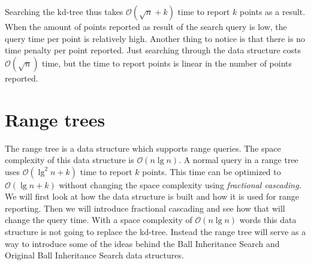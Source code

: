 
Searching the kd-tree thus takes $\mathcal{O}(\sqrt{n} + k)$ time to report $k$ points as a result. When the amount of points reported as result of the search query is low, the query time per point is relatively high. Another thing to notice is that there is no time penalty per point reported. Just searching through the data structure costs $\mathcal{O}(\sqrt{n})$ time, but the time to report points is linear in the number of points reported.



\section{Range trees}
\label{sect:rangetrees}

The range tree is a data structure which supports range queries. The space complexity of this data structure is $\mathcal{O}(n\lg n)$. A normal query in a range tree uses $\mathcal{O}(\lg^2 n + k)$ time to report $k$ points. This time can be optimized to $\mathcal{O}(\lg n + k)$ without changing the space complexity using \emph{fractional cascading}. We will first look at how the data structure is built and how it is used for range reporting. Then we will introduce fractional cascading and see how that will change the query time. With a space complexity of $\mathcal{O}(n \lg n)$ words this data structure is not going to replace the kd-tree. Instead the range tree will serve as a way to introduce some of the ideas behind the Ball Inheritance Search and Original Ball Inheritance Search data structures. \\


